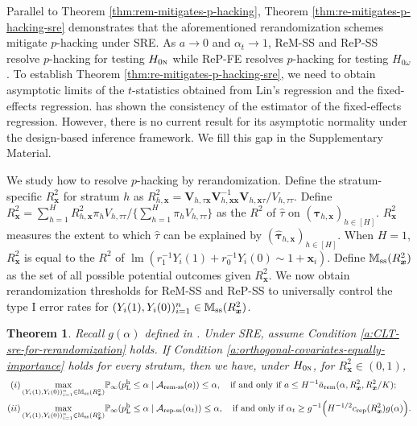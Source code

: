 \documentclass[12pt]{article}
\newtheorem{theorem}{Theorem}
\newcommand{\lmm}{\operatorname{lm}}
\newcommand{\sss}{\textnormal{ss}}
\newcommand{\Prob}{\mathbb{P}}
\newcommand{\ma}{\mathcal{A}}
\newcommand{\rem}{\textnormal{rem}}
\newcommand{\remss}{\textnormal{rem-ss}}
\newcommand{\repss}{\textnormal{rep-ss}}
\newcommand{\rep}{\textnormal{rep}}
\newcommand{\bs}{\boldsymbol}
\newcommand{\hpL}{p_\textnormal{L}^{\textnormal{h}}}
\begin{document}
Parallel to Theorem \ref{thm:rem-mitigates-p-hacking}, Theorem \ref{thm:re-mitigates-p-hacking-sre} demonstrates that the aforementioned rerandomization schemes mitigate $p$-hacking under SRE. As $a\rightarrow 0$ and $\alpha_t\rightarrow 1$, ReM-SS and ReP-SS resolve $p$-hacking for testing $H_{0\textsc{n}}$ while ReP-FE resolves $p$-hacking for testing $H_{0\omega}$. To establish Theorem \ref{thm:re-mitigates-p-hacking-sre}, we need to obtain asymptotic limits of the $t$-statistics obtained from Lin's regression and the fixed-effects regression. \citet{zdrep} has shown the consistency of the estimator of the fixed-effects regression. However, there is no current result for its asymptotic normality under the design-based inference framework.  We fill this gap in the Supplementary Material. 


We study how to resolve $p$-hacking by rerandomization. Define the stratum-specific $R^2_{\bs{x}}$ for stratum $h$ as $R^2_{ h, \bs{x}} = \bs{V}_{ h, \tau \bs{x}}\bs{V}_{ h,  \bs{x}\bs{x}}^{-1}\bs{V}_{ h,  \bs{x}\tau}/V_{h,\tau\tau}$. Define $R^2_{\bs{x}} = \sum_{h=1}^H R^2_{ h, \bs{x}} \pi_{ h } V_{h,\tau\tau}/\{\sum_{h=1}^H \pi_{ h } V_{h,\tau\tau}\}$ as the $R^2$ of $\hat{\tau}$ on $(\hat{\bs{\tau}}_{h, \bs{x}})_{h\in [H]}$. 
$R^2_{\bs{x}}$ measures the extent to which $\hat{\tau}$ can be explained by $(\hat{\bs{\tau}}_{h, \bs{x}})_{h\in [H]}$. When $H=1$, $R^2_{\bs{x}}$ is equal to the $R^2$ of $\lmm(r_1^{-1}Y_i(1) + r_0^{-1}Y_i(0)\sim 1+ \bs{x}_i)$. Define
$\mathbb{M}_{\sss}(R^2_{\bs{x}})$ as the set of all possible potential outcomes given $R^2_{\bs{x}}$. We now obtain 
rerandomization thresholds for ReM-SS and ReP-SS to universally control the type I error rates for $(Y_i(1),Y_i(0))_{i=1}^n\in\mathbb{M}_{\sss}(R^2_{\bs{x}})$.

\begin{theorem}
 \label{thm:sufficient-complete-condition-for-orthogonal-equal-importance}
 Recall $g(\alpha)$ defined in . Under SRE, assume Condition \ref{a:CLT-sre-for-rerandomization} holds. If Condition \ref{a:orthogonal-covariates-equally-importance} holds for every stratum, then we have, under $H_{0\textsc{n}}$, for $R^2_{\bs{x}} \in (0,1)$,
 \begin{align*}
 (i) \max_{(Y_i(1),Y_i(0))_{i=1}^n\in\mathbb{M}_{\sss}(R^2_{\bs{x}})}&\Prob_{\infty}( \hpL \leq \alpha\mid \ma_{\remss}(a))  \leq \alpha,~~~
 \text{if and only if}~ a \leq H^{-1}\bar{a}_\rem(\alpha,R^2_{\bs{x}}, R^2_{\bs{x}}/K);\\
(ii)\max_{(Y_i(1),Y_i(0))_{i=1}^n\in\mathbb{M}_{\sss}(R^2_{\bs{x}})}&\Prob_{\infty}( \hpL \leq \alpha\mid \ma_{\repss}(\alpha_t)) \leq \alpha, ~~~
 \text{if and only if}~ \alpha_t \geq g^{-1}\Big(H^{-1/2}c_{\rep}(R^2_{\bs{x}})g(\alpha)\Big).
    \end{align*}
\end{theorem}
\end{document}
